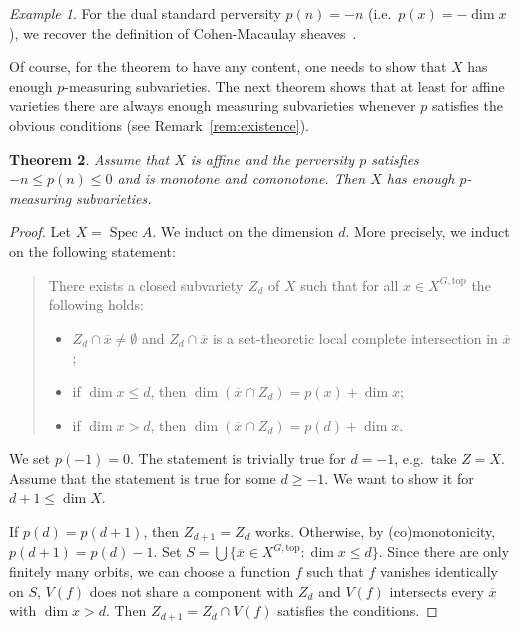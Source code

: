 \documentclass{compositio}
\theoremstyle{plain}
\newtheorem{Thm}{Theorem}
\theoremstyle{definition}
\theoremstyle{remark}
\newtheorem{Ex}[Thm]{Example}
\DeclareMathOperator\Spec{Spec}
\newcommand\Xtop[1][X]{#1^{G,\mathrm{top}}}
\begin{document}
\begin{Ex}
    For the dual standard perversity $p(n) = -n$ (i.e.\ $p(x) = -\dim x$), we recover the definition of Cohen-Macaulay sheaves~\cite[Section~IV.3]{Hartshorne:1966:ResiduesAndDuality}.
\end{Ex}

Of course, for the theorem to have any content, one needs to show that $X$ has enough $p$-measuring subvarieties.
The next theorem shows that at least for affine varieties there are always enough measuring subvarieties whenever $p$ satisfies the obvious conditions (see Remark~\ref{rem:existence}).

\begin{Thm}\label{thm:existance}%
    Assume that $X$ is affine and the perversity $p$ satisfies $-n \le p(n) \le 0$ and is monotone and comonotone.
    Then $X$ has enough $p$-measuring subvarieties.
\end{Thm}

\begin{proof}
    Let $X = \Spec A$.
    We induct on the dimension $d$.
    More precisely, we induct on the following statement:
    \begin{quote}
        There exists a closed subvariety $Z_d$ of $X$ such that for all $x \in  \Xtop$ the following holds:
        \begin{itemize}
            \item $Z_d \cap \overline x \ne \emptyset$ and $Z_d \cap \overline x$ is a set-theoretic local complete intersection in $\overline x$;
            \item if $\dim x \le d$, then $\dim(\overline x \cap  Z_d) = p(x) + \dim x$;
            \item if $\dim x > d$, then $\dim(\overline x \cap  Z_d) = p(d) + \dim x$.
        \end{itemize}
    \end{quote}
    We set $p(-1) = 0$.
    The statement is trivially true for $d = -1$, e.g.~take $Z = X$.
    Assume that the statement is true for some $d \ge -1$.
    We want to show it for $d+1 \le \dim X$.

    If $p(d) = p(d+1)$, then $Z_{d+1} = Z_{d}$ works.
    Otherwise, by (co)monotonicity, $p(d+1) = p(d) - 1$.
    Set $S = \bigcup \{ \overline x \in  \Xtop : \dim x \le d\}$.
    Since there are only finitely many orbits, we can choose a function $f$ such that $f$ vanishes identically on $S$, $V(f)$ does not share a component with $Z_d$ and $V(f)$ intersects every $\overline x$ with $\dim x > d$.
    Then $Z_{d+1} = Z_d \cap V(f)$ satisfies the conditions.
\end{proof}
\end{document}
